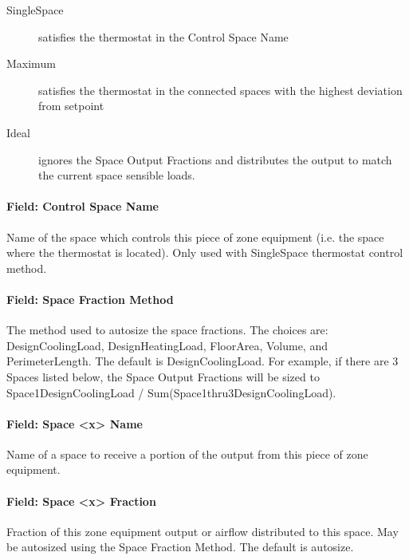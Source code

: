 \begin{description}
       \item[SingleSpace] satisfies the thermostat in the Control Space Name
       \item[Maximum] satisfies the thermostat in the connected spaces with the highest deviation from setpoint
       \item[Ideal] ignores the Space Output Fractions and distributes the output to match the current space sensible loads.
\end{description}
 
\paragraph{Field: Control Space Name}\label{field-seqsplitter-control-space-name}

Name of the space which controls this piece of zone equipment (i.e. the space where the thermostat is located). Only used with SingleSpace thermostat control method.

\paragraph{Field: Space Fraction Method}\label{field-seqsplitter-space-sizing-basis}

The method used to autosize the space fractions. The choices are: DesignCoolingLoad, DesignHeatingLoad, FloorArea, Volume, and PerimeterLength. The default is DesignCoolingLoad.
For example, if there are 3 Spaces listed below, the Space Output Fractions will be sized to Space1DesignCoolingLoad / Sum(Space1thru3DesignCoolingLoad).

\paragraph{Field: Space \textless{}x\textgreater{} Name}\label{field-seqsplitter-space-name}

Name of a space to receive a portion of the output from this piece of zone equipment.

\paragraph{Field: Space \textless{}x\textgreater{} Fraction}\label{field-seqsplitter-space-output-fraction}

Fraction of this zone equipment output or airflow distributed to this space. May be autosized using the Space Fraction Method. The default is autosize.

